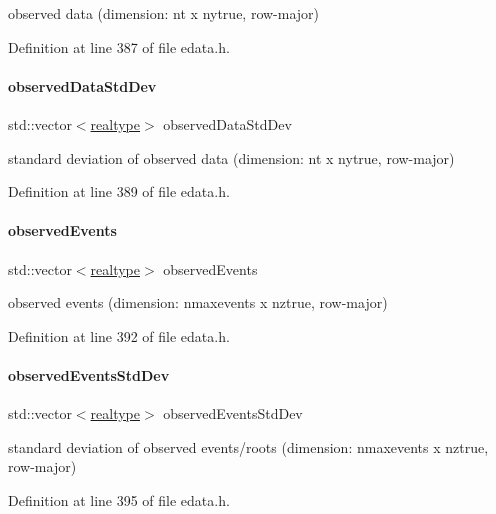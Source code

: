 observed data (dimension\+: nt x nytrue, row-\/major) 

Definition at line 387 of file edata.\+h.

\mbox{\label{classamici_1_1_exp_data_aa097568cebb4be48c4c1dfaab0c2a159}} 
\paragraph{\texorpdfstring{observed\+Data\+Std\+Dev}{observedDataStdDev}}
{\footnotesize\ttfamily std\+::vector$<$\mbox{\hyperlink{namespaceamici_a1bdce28051d6a53868f7ccbf5f2c14a3}{realtype}}$>$ observed\+Data\+Std\+Dev\hspace{0.3cm}{\ttfamily [protected]}}

standard deviation of observed data (dimension\+: nt x nytrue, row-\/major) 

Definition at line 389 of file edata.\+h.

\mbox{\label{classamici_1_1_exp_data_a629e6085839e16bac95ef0eba580f7f0}} 
\paragraph{\texorpdfstring{observed\+Events}{observedEvents}}
{\footnotesize\ttfamily std\+::vector$<$\mbox{\hyperlink{namespaceamici_a1bdce28051d6a53868f7ccbf5f2c14a3}{realtype}}$>$ observed\+Events\hspace{0.3cm}{\ttfamily [protected]}}

observed events (dimension\+: nmaxevents x nztrue, row-\/major) 

Definition at line 392 of file edata.\+h.

\mbox{\label{classamici_1_1_exp_data_abb12a8f75b4e6c936ae6c0be770628c9}} 
\paragraph{\texorpdfstring{observed\+Events\+Std\+Dev}{observedEventsStdDev}}
{\footnotesize\ttfamily std\+::vector$<$\mbox{\hyperlink{namespaceamici_a1bdce28051d6a53868f7ccbf5f2c14a3}{realtype}}$>$ observed\+Events\+Std\+Dev\hspace{0.3cm}{\ttfamily [protected]}}

standard deviation of observed events/roots (dimension\+: nmaxevents x nztrue, row-\/major) 

Definition at line 395 of file edata.\+h.

